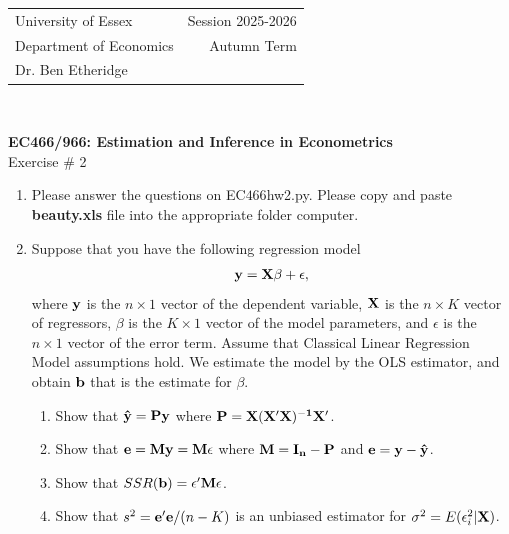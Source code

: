 \documentclass[12pt,a4paper]{article}
\begin{document}
\begin{tabular}{l r}
University of Essex  \hspace{35ex}& Session 2025-2026 \\
Department of Economics \hspace{35ex} & Autumn Term\\
Dr. Ben Etheridge \hspace{35ex} &
\end{tabular}
\\
\begin{center}
\large{\textbf{EC466/966: Estimation and Inference in Econometrics}\\
Exercise \# 2}
\end{center}

\begin{enumerate}
\item{Please answer the questions on EC$466$hw2.py. Please copy and paste {\bf beauty.xls} file into the appropriate folder computer.}
\item{Suppose that you have the following regression model}
\begin{align*}
{\bf y}={\bf X}\beta +\epsilon,
\end{align*}
where ${\bf y}$ is the $n \times 1$ vector of the dependent variable, ${\bf X}$ is the $n \times K$ vector of regressors, $\beta$ is the $K \times 1$ vector of the model parameters, and $\epsilon$ is the $n \times 1$ vector of the error term. Assume that Classical Linear Regression Model assumptions hold. We estimate the model by the OLS estimator, and obtain ${\bf b}$ that is the estimate for $\beta$.
\begin{enumerate}
\item{Show that ${\bf \hat{y}}={\bf P y}$ where ${\bf P=X(X'X)^{-1}X'}$.}
\item{Show that ${\bf e=My=M\epsilon}$ where ${\bf M=I_{n}-P}$ and ${\bf e=y-\hat{y}}$.}
\item{Show that $SSR({\bf b})=\epsilon'{\bf M}\epsilon$.}
\item{Show that $s^{2}={\bf e'e}/(n-K)$ is an unbiased estimator for $\sigma^{2}=E(\epsilon_{i}^{2}|{\bf X})$.}
\end{enumerate}
\vspace*{0.5cm}
\end{enumerate}
\end{document}
